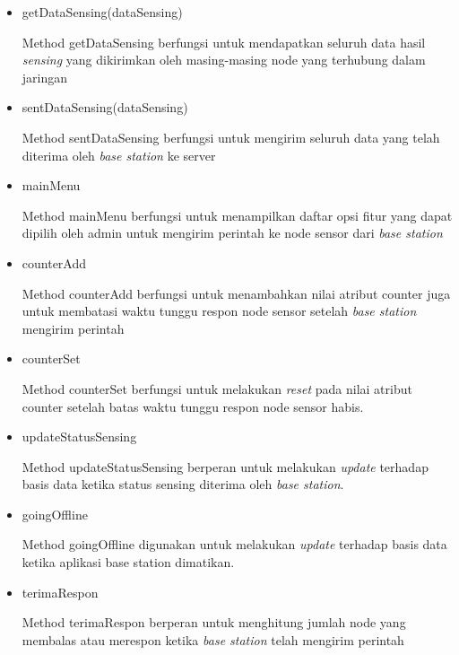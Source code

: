     \begin{itemize}
        \item getDataSensing(dataSensing)
        
        Method getDataSensing berfungsi untuk mendapatkan seluruh data hasil \textit{sensing} yang dikirimkan oleh masing-masing node yang terhubung dalam jaringan
        
        
        \item sentDataSensing(dataSensing)
        
        Method sentDataSensing berfungsi untuk mengirim seluruh data yang telah diterima oleh \textit{base station} ke server
        
        \item mainMenu
        
        Method mainMenu berfungsi untuk menampilkan daftar opsi fitur yang dapat dipilih oleh admin untuk mengirim perintah ke node sensor dari \textit{base station}
        
        \item counterAdd
        
        Method counterAdd berfungsi untuk menambahkan nilai atribut counter juga untuk membatasi waktu tunggu respon node sensor setelah \textit{base station} mengirim perintah
        
        \item counterSet
        
        Method counterSet berfungsi untuk melakukan \textit{reset} pada nilai atribut counter setelah batas waktu tunggu respon node sensor habis.
        
        \item updateStatusSensing
        
        Method updateStatusSensing berperan untuk melakukan \textit{update} terhadap basis data ketika status sensing diterima oleh \textit{base station}.
        
        \item goingOffline
        
        Method goingOffline digunakan untuk melakukan \textit{update} terhadap basis data ketika aplikasi base station dimatikan.
        
        \item terimaRespon
        
        Method terimaRespon berperan untuk menghitung jumlah node yang membalas atau merespon ketika \textit{base station} telah mengirim perintah
        
    \end{itemize}

